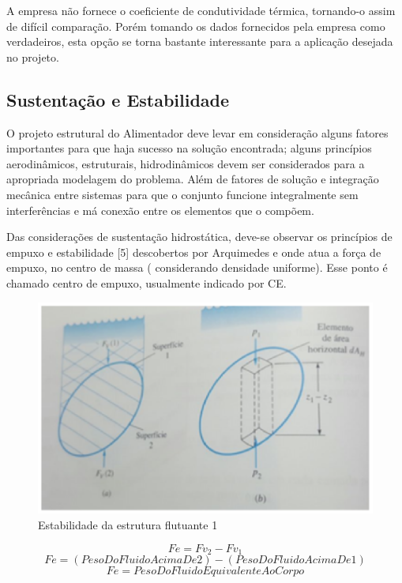 A empresa não fornece o coeficiente de condutividade térmica, tornando-o assim de difícil comparação. Porém tomando os dados fornecidos pela empresa como verdadeiros, esta opção se torna bastante interessante para a aplicação desejada no projeto.

\subsection{Sustentação e Estabilidade}

O projeto estrutural do Alimentador deve levar em consideração alguns fatores importantes para que haja sucesso na solução encontrada; alguns princípios aerodinâmicos, estruturais, hidrodinâmicos devem ser considerados para a apropriada modelagem do problema. Além de fatores de solução e integração mecânica entre sistemas para que o conjunto funcione integralmente sem interferências e má conexão entre os elementos que o compõem.

Das considerações de sustentação hidrostática, deve-se observar os princípios de empuxo e estabilidade [5] descobertos por Arquimedes e onde atua a força de empuxo, no centro de massa ( considerando densidade uniforme). Esse ponto é chamado centro de empuxo, usualmente indicado por CE.

\begin{figure}[H]
 \centering
   \includegraphics[keepaspectratio=true,scale=0.8]{figuras/circulos_1.eps}
 \caption{Estabilidade da estrutura flutuante 1}
 \label{estabilidade1}
\end{figure}

\[Fe = Fv_{2} -Fv_{1}\]
\[Fe = (PesoDoFluidoAcimaDe2) - (PesoDoFluidoAcimaDe1)\]
\[Fe = PesoDoFluidoEquivalenteAo Corpo\]

